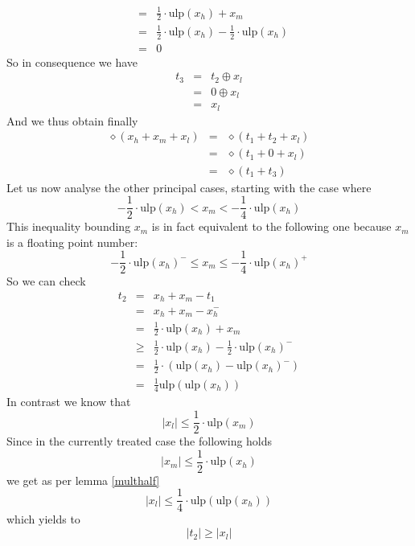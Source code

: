 \documentclass[a4paper,10pt,twoside]{article}
\newenvironment{proof}[1][Proof]{\begin{trivlist}
\item[\hskip \labelsep {\bfseries #1}]}{\end{trivlist}}
\newcommand{\hi}{\ensuremath{\mathit{h}}}
\newcommand{\mi}{\ensuremath{\mathit{m}}}
\newcommand{\lo}{\ensuremath{\mathit{l}}}
\newcommand{\mUlp}{\ensuremath{\mathrm{ulp}}}
\begin{document}
\begin{proof}
\begin{eqnarray*}
& = & \frac{1}{2} \cdot \mUlp\left( x_\hi \right) + x_\mi \\
& = & \frac{1}{2} \cdot \mUlp\left( x_\hi \right) - \frac{1}{2} \cdot \mUlp\left( x_\hi \right) \\
& = & 0 
\end{eqnarray*}
So in consequence we have
\begin{eqnarray*}
t_3 & = & t_2 \oplus x_\lo \\
& = & 0 \oplus x_\lo \\
& = & x_\lo
\end{eqnarray*}
And we thus obtain finally
\begin{eqnarray*}
\diamond \left( x_\hi + x_\mi + x_\lo \right) & = & \diamond \left( t_1 + t_2 + x_\lo \right) \\
& = & \diamond \left( t_1 + 0 + x_\lo \right) \\
& = & \diamond \left( t_1 + t_3 \right)
\end{eqnarray*}
Let us now analyse the other principal cases, starting with the case where 
$$-\frac{1}{2} \cdot \mUlp\left( x_\hi \right) < x_\mi < -\frac{1}{4} \cdot \mUlp\left( x_\hi \right)$$
This inequality bounding $x_\mi$ is in fact equivalent to the following one because $x_\mi$ is a floating point number:
$$-\frac{1}{2} \cdot \mUlp\left( x_\hi \right)^- \leq x_\mi \leq -\frac{1}{4} \cdot \mUlp\left( x_\hi \right)^+$$
So we can check
\begin{eqnarray*}
t_2 & = & x_\hi + x_\mi - t_1 \\
& = & x_\hi + x_\mi - x_\hi^- \\
& = & \frac{1}{2} \cdot \mUlp\left( x_\hi \right) + x_\mi \\
& \geq & \frac{1}{2} \cdot \mUlp\left( x_\hi \right) - \frac{1}{2} \cdot \mUlp\left( x_\hi \right)^- \\
& = & \frac{1}{2} \cdot \left( \mUlp\left( x_\hi \right) - \mUlp\left( x_\hi \right)^- \right) \\
& = & \frac{1}{4} \mUlp\left( \mUlp\left( x_\hi \right) \right)
\end{eqnarray*}
In contrast we know that
$$\left \vert x_\lo \right \vert \leq \frac{1}{2} \cdot \mUlp \left( x_\mi \right)$$
Since in the currently treated case the following holds
$$\left \vert x_\mi \right \vert \leq \frac{1}{2} \cdot \mUlp\left( x_\hi \right)$$
we get as per lemma \ref{multhalf} 
$$\left \vert x_\lo \right \vert \leq \frac{1}{4} \cdot \mUlp\left( \mUlp\left( x_\hi \right) \right)$$
which yields to
$$\left \vert t_2 \right \vert \geq \left \vert x_\lo \right \vert$$

\end{proof}
\end{document}
